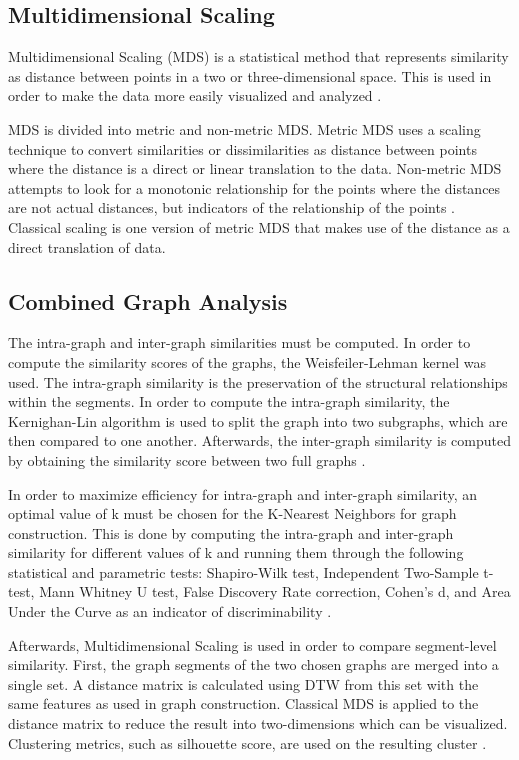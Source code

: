 \subsection{Multidimensional Scaling}
Multidimensional Scaling (MDS) is a statistical method that represents similarity as distance between points in a two or three-dimensional space. This is used in order to make the data more easily visualized and analyzed \cite{ModernMDS}.

MDS is divided into metric and non-metric MDS. Metric MDS uses a scaling technique to convert similarities or dissimilarities as distance between points where the distance is a direct or linear translation to the data. Non-metric MDS attempts to look for a monotonic relationship for the points where the distances are not actual distances, but indicators of the relationship of the points \cite{NonmetricMDS}. Classical scaling is one version of metric MDS that makes use of the distance as a direct translation of data. \cite{ModernMDS}

\subsection{Combined Graph Analysis}
The intra-graph and inter-graph similarities must be computed. In order to compute the similarity scores of the graphs, the Weisfeiler-Lehman kernel was used. The intra-graph similarity is the preservation of the structural relationships within the segments. In order to compute the intra-graph similarity, the Kernighan-Lin algorithm is used to split the graph into two subgraphs, which are then compared to one another. Afterwards, the inter-graph similarity is computed by obtaining the similarity score between two full graphs \cite{ConananEtAl}.

In order to maximize efficiency for intra-graph and inter-graph similarity, an optimal value of k must be chosen for the K-Nearest Neighbors for graph construction. This is done by computing the intra-graph and inter-graph similarity for different values of k and running them through the following statistical and parametric tests: Shapiro-Wilk test, Independent Two-Sample t-test, Mann Whitney U test, False Discovery Rate correction, Cohen's d, and Area Under the Curve as an indicator of discriminability \cite{ConananEtAl}.

Afterwards, Multidimensional Scaling is used in order to compare segment-level similarity. First, the graph segments of the two chosen graphs are merged into a single set. A distance matrix is calculated using DTW from this set with the same features as used in graph construction. Classical MDS is applied to the distance matrix to reduce the result into two-dimensions which can be visualized. Clustering metrics, such as silhouette score, are used on the resulting cluster \cite{ConananEtAl}.

